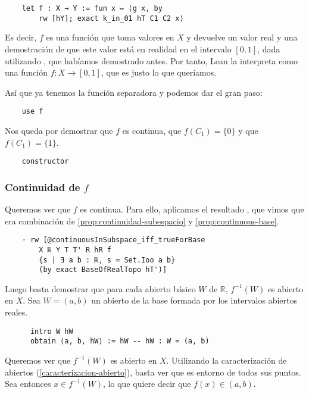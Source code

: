 \begin{lstlisting}
    let f : X → Y := fun x ↦ ⟨g x, by
        rw [hY]; exact k_in_01 hT C1 C2 x⟩
\end{lstlisting}

Es decir, $f$ es una función que toma valores en $X$ y devuelve un valor real y una demostración de que este valor está en realidad en el intervalo $[0, 1]$, dada utilizando , que habíamos demostrado antes. Por tanto, Lean la interpreta como una función $f : X \to [0, 1]$, que es justo lo que queríamos.

Así que ya tenemos la función separadora y podemos dar el gran paso:

\begin{lstlisting}
    use f
\end{lstlisting}

Nos queda por demostrar que $f$ es continua, que $f(C_1) = \{0\}$ y que $f(C_1) = \{1\}$.

\begin{lstlisting}
    constructor
\end{lstlisting}

\subsubsection{Continuidad de $f$}

Queremos ver que $f$ es continua. Para ello, aplicamos el resultado , que vimos que era combinación de \ref{prop:continuidad-subespacio} y \ref{prop:continuous-base}.

\begin{lstlisting}
    · rw [@continuousInSubspace_iff_trueForBase
        X ℝ Y T T' R hR f
        {s | ∃ a b : ℝ, s = Set.Ioo a b}
        (by exact BaseOfRealTopo hT')]
\end{lstlisting}

Luego basta demostrar que para cada abierto básico $W$ de $\mathbb{R}$, $f^{-1}(W)$ es abierto en $X$. Sea $W = (a, b)$ un abierto de la base formada por los intervalos abiertos reales.

\begin{lstlisting}
      intro W hW
      obtain ⟨a, b, hW⟩ := hW -- hW : W = (a, b)
\end{lstlisting}

Queremos ver que $f^{-1}(W)$ es abierto en $X$. Utilizando la caracterización de abiertos (\ref{caracterizacion-abierto}), basta ver que es entorno de todos sus puntos. Sea entonces $x \in f^{-1}(W)$, lo que quiere decir que $f(x) \in (a, b)$.

